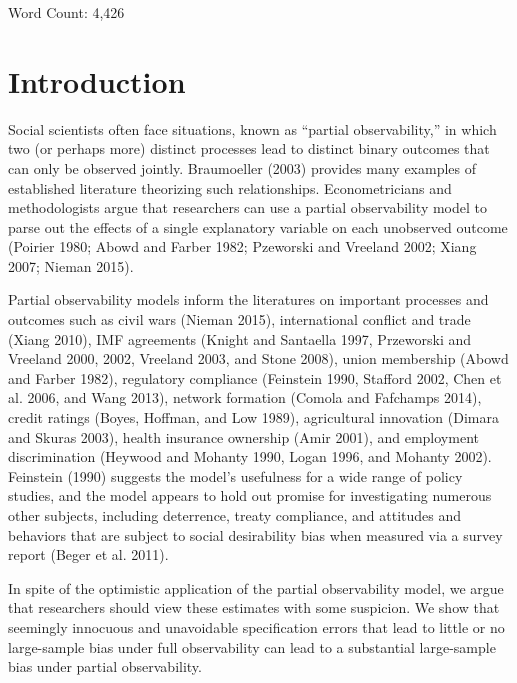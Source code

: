 \documentclass[10pt]{article}
\begin{document}
\vspace{10mm}
\begin{center}
Word Count: 4,426
\end{center}

\thispagestyle{empty}

\newpage
\doublespace

\section*{Introduction}

Social scientists often face situations, known as ``partial observability,'' in which two (or perhaps more) distinct processes lead to distinct binary outcomes that can only be observed jointly. 
Braumoeller (2003) provides many examples of established literature theorizing such relationships. 
Econometricians and methodologists argue that researchers can use a partial observability model to parse out the effects of a single explanatory variable on each unobserved outcome (Poirier 1980; Abowd and Farber 1982; Pzeworski and Vreeland 2002; Xiang 2007; Nieman 2015).  

Partial observability models inform the literatures on important processes and outcomes such as civil wars (Nieman 2015), international conflict and trade (Xiang 2010), IMF agreements (Knight and Santaella 1997, Przeworski and Vreeland 2000, 2002, Vreeland 2003, and Stone 2008), union membership (Abowd and Farber 1982), regulatory compliance (Feinstein 1990, Stafford 2002, Chen et al. 2006, and Wang 2013), network formation (Comola and Fafchamps 2014), credit ratings (Boyes, Hoffman, and Low 1989), agricultural innovation (Dimara and Skuras 2003), health insurance ownership (Amir 2001), and employment discrimination (Heywood and Mohanty 1990, Logan 1996, and Mohanty 2002). 
Feinstein (1990) suggests the model's usefulness for a wide range of policy studies, and the model appears to hold out promise for investigating numerous other subjects, including deterrence, treaty compliance, and attitudes and behaviors that are subject to social desirability bias when measured via a survey report (Beger et al. 2011). 

In spite of the optimistic application of the partial observability model, we argue that researchers should view these estimates with some suspicion. 
We show that seemingly innocuous and unavoidable specification errors that lead to little or no large-sample bias under full observability can lead to a substantial large-sample bias under partial observability.
\end{document}
